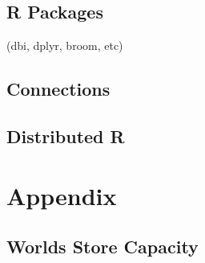\documentclass[]{book}
\theoremstyle{definition}
\theoremstyle{definition}
\theoremstyle{definition}
\theoremstyle{remark}
\begin{document}
\hypertarget{r-packages}{%
\section{R Packages}\label{r-packages}}

(dbi, dplyr, broom, etc)

\hypertarget{connections-1}{%
\section{Connections}\label{connections-1}}

\hypertarget{distributed-r}{%
\section{Distributed R}\label{distributed-r}}

\hypertarget{appendix}{%
\chapter*{Appendix}\label{appendix}}

\hypertarget{storage-capacity}{%
\section{Worlds Store Capacity}\label{storage-capacity}}
\end{document}
